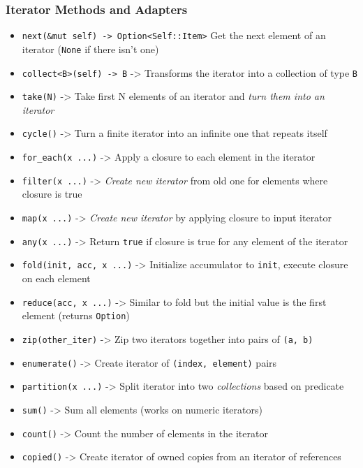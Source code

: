 \documentclass[
  11pt,
]{article}
\providecommand{\tightlist}{%
  \setlength{\itemsep}{0pt}\setlength{\parskip}{0pt}}
\begin{document}
\subsubsection{Iterator Methods and
Adapters}\label{iterator-methods-and-adapters}

\begin{itemize}
\tightlist
\item
  \texttt{next(\&mut\ self)\ -\textgreater{}\ Option\textless{}Self::Item\textgreater{}}
  Get the next element of an iterator (\texttt{None} if there isn't one)
\item
  \texttt{collect\textless{}B\textgreater{}(self)\ -\textgreater{}\ B}
  -\textgreater{} Transforms the iterator into a collection of type
  \texttt{B}
\item
  \texttt{take(N)} -\textgreater{} Take first N elements of an iterator
  and \emph{turn them into an iterator}
\item
  \texttt{cycle()} -\textgreater{} Turn a finite iterator into an
  infinite one that repeats itself
\item
  \texttt{for\_each(\textbar{}x\textbar{}\ ...)} -\textgreater{} Apply a
  closure to each element in the iterator
\item
  \texttt{filter(\textbar{}x\textbar{}\ ...)} -\textgreater{}
  \emph{Create new iterator} from old one for elements where closure is
  true
\item
  \texttt{map(\textbar{}x\textbar{}\ ...)} -\textgreater{} \emph{Create
  new iterator} by applying closure to input iterator
\item
  \texttt{any(\textbar{}x\textbar{}\ ...)} -\textgreater{} Return
  \texttt{true} if closure is true for any element of the iterator
\item
  \texttt{fold(init,\ \textbar{}acc,\ x\textbar{}\ ...)} -\textgreater{}
  Initialize accumulator to \texttt{init}, execute closure on each
  element
\item
  \texttt{reduce(\textbar{}acc,\ x\textbar{}\ ...)} -\textgreater{}
  Similar to fold but the initial value is the first element (returns
  \texttt{Option})
\item
  \texttt{zip(other\_iter)} -\textgreater{} Zip two iterators together
  into pairs of \texttt{(a,\ b)}
\item
  \texttt{enumerate()} -\textgreater{} Create iterator of
  \texttt{(index,\ element)} pairs
\item
  \texttt{partition(\textbar{}x\textbar{}\ ...)} -\textgreater{} Split
  iterator into two \emph{collections} based on predicate
\item
  \texttt{sum()} -\textgreater{} Sum all elements (works on numeric
  iterators)
\item
  \texttt{count()} -\textgreater{} Count the number of elements in the
  iterator
\item
  \texttt{copied()} -\textgreater{} Create iterator of owned copies from
  an iterator of references
\end{itemize}
\end{document}
